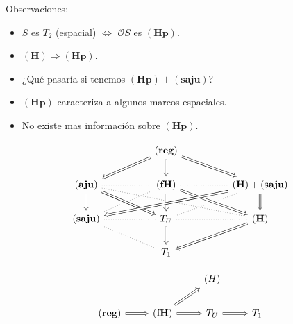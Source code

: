\documentclass[compress,12pt]{beamer}
\begin{document}
\begin{frame}
    \begin{block}{Observaciones:}
        \begin{itemize}
            \item $S$ es $T_2$ (espacial) $\Leftrightarrow$ $\mathcal{O}S$ es $\mathbf{(Hp)}$.
            \item<2-> $\mathbf{(H)}\Rightarrow \mathbf{(Hp)}$.
            \item<3-> ¿Qué pasaría si tenemos $\mathbf{(Hp)}+\mathbf{(saju)}$?
            \item<4-> $\mathbf{(Hp)}$ caracteriza a algunos marcos espaciales.
            \item<5-> No existe mas información sobre $\mathbf{(Hp)}$.
        \end{itemize}
    \end{block}
\end{frame}

\begin{frame}
    \[\begin{tikzcd}
	&& {\mathbf{(reg)}} \\
	{\mathbf{(aju)}} && {\mathbf{(fH)}} && {\mathbf{(H)}+\mathbf{(saju)}} \\
	{\mathbf{(saju)}} && {T_U} && {\mathbf{(H)}} \\
	&& {T_1}
	\arrow[Rightarrow, from=1-3, to=2-1]
	\arrow[Rightarrow, from=1-3, to=2-3]
	\arrow[Rightarrow, from=1-3, to=2-5]
	\arrow[dotted, no head, from=2-1, to=2-3]
	\arrow[Rightarrow, from=2-1, to=3-1]
	\arrow[Rightarrow, from=2-1, to=3-3]
	\arrow[dotted, no head, from=2-1, to=3-5]
	\arrow[dotted, no head, from=2-3, to=2-5]
	\arrow[dotted, no head, from=2-3, to=3-1]
	\arrow[Rightarrow, from=2-3, to=3-3]
	\arrow[Rightarrow, from=2-3, to=3-5]
	\arrow[Rightarrow, from=2-5, to=3-1]
	\arrow[dotted, no head, from=2-5, to=3-3]
	\arrow[Rightarrow, from=2-5, to=3-5]
	\arrow[dotted, no head, from=3-1, to=3-3]
	\arrow[dotted, no head, from=3-1, to=4-3]
	\arrow[dotted, no head, from=3-3, to=3-5]
	\arrow[Rightarrow, from=3-3, to=4-3]
	\arrow[Rightarrow, from=3-5, to=4-3]
\end{tikzcd}\]

\[\begin{tikzcd}
	&& {(H)} \\
	{\mathbf{(reg)}} & {\mathbf{(fH)}} & {T_U} & {T_1}
	\arrow[Rightarrow, from=2-1, to=2-2]
	\arrow[Rightarrow, from=2-2, to=1-3]
	\arrow[Rightarrow, from=2-2, to=2-3]
	\arrow[Rightarrow, from=2-3, to=2-4]
\end{tikzcd}\]
\end{frame}
\end{document}
